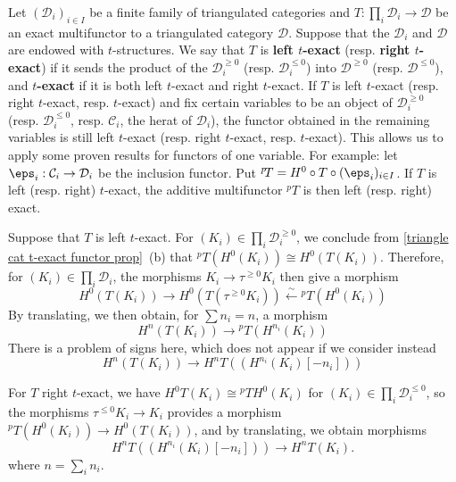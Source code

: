 Let $(\mathcal{D}_i)_{i\in I}$ be a finite family of triangulated categories and $T:\prod_i\mathcal{D}_i\to\mathcal{D}$ be an exact multifunctor to a triangulated category $\mathcal{D}$. Suppose that the $\mathcal{D}_i$ and $\mathcal{D}$ are endowed with $t$-structures. We say that $T$ is \textbf{left $t$-exact} (resp. \textbf{right $t$-exact}) if it sends the product of the $\mathcal{D}_i^{\geq 0}$ (resp. $\mathcal{D}_i^{\leq 0}$) into $\mathcal{D}^{\geq 0}$ (resp. $\mathcal{D}^{\leq 0}$), and \textbf{$t$-exact} if it is both left $t$-exact and right $t$-exact. If $T$ is left $t$-exact (resp. right $t$-exact, resp. $t$-exact) and fix certain variables to be an object of $\mathcal{D}_i^{\geq 0}$ (resp. $\mathcal{D}_i^{\leq 0}$, resp. $\mathcal{C}_i$, the herat of $\mathcal{D}_i$), the functor obtained in the remaining variables is still left $t$-exact (resp. right $t$-exact, resp. $t$-exact). This allows us to apply some proven results for functors of one variable. For example: let $\eps_i:\mathcal{C}_i\to\mathcal{D}_i$ be the inclusion functor. Put ${^p\!T}=H^0\circ T\circ(\eps_i)_{i\in I}$. If $T$ is left (resp. right) $t$-exact, the additive multifunctor ${^p\!T}$ is then left (resp. right) exact.\par
Suppose that $T$ is left $t$-exact. For $(K_i)\in\prod_i\mathcal{D}_i^{\geq 0}$, we conclude from \cref{triangle cat t-exact functor prop}~(b) that ${^p\!T}(H^0(K_i))\cong H^0(T(K_i))$. Therefore, for $(K_i)\in\prod_i\mathcal{D}_i$, the morphisms $K_i\to\tau^{\geq 0}K_i$ then give a morphism
\begin{equation}\label{triangle cat multifunctor t-exact-1}
H^0(T(K_i))\to H^0(T(\tau^{\geq 0}K_i))\stackrel{\sim}{\leftarrow} {^p\!T}(H^0(K_i))
\end{equation}
By translating, we then obtain, for $\sum n_i=n$, a morphism
\begin{equation}\label{triangle cat multifunctor t-exact-2}
H^n(T(K_i))\to {^p\!T}(H^{n_i}(K_i))
\end{equation}
There is a problem of signs here, which does not appear if we consider instead
\begin{equation}\label{triangle cat multifunctor t-exact-3}
H^n(T(K_i))\to H^nT((H^{n_i}(K_i)[-n_i]))
\end{equation}

For $T$ right $t$-exact, we have $H^0T(K_i)\cong {^p\!T}H^0(K_i)$ for $(K_i)\in\prod_i\mathcal{D}_i^{\leq 0}$, so the morphisms $\tau^{\leq 0}K_i\to K_i$ provides a morphism ${^p\!T}(H^0(K_i))\to H^0(T(K_i))$, and by translating, we obtain morphisms
\begin{equation}\label{triangle cat multifunctor t-exact-4}
H^nT((H^{n_i}(K_i)[-n_i]))\to H^nT(K_i).
\end{equation}
where $n=\sum_in_i$.\par

